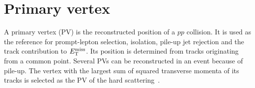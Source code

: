 \section{Primary vertex}
\label{sec:ch6_primary_vertex}

A primary vertex (PV) is the reconstructed position of a $pp$ collision.
It is used as the reference for prompt-lepton selection, isolation, pile-up jet rejection and the track contribution to $E_{\mathrm{T}}^{\mathrm{miss}}$.
Its position is determined from tracks originating from a common point.
Several PVs can be reconstructed in an event because of pile-up.
The vertex with the largest sum of squared transverse momenta of its tracks is selected as the PV of the hard scattering~\cite{ATLAS2015Vertex}.
